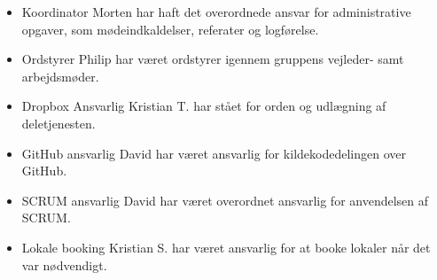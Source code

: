 \begin{itemize}
	\item Koordinator \newline
		Morten har haft det overordnede ansvar for administrative opgaver, som mødeindkaldelser, referater og 			logførelse.
	\item Ordstyrer \newline
		Philip har været ordstyrer igennem gruppens vejleder- samt arbejdsmøder.
	\item Dropbox Ansvarlig \newline
		Kristian T. har stået for orden og udlægning af deletjenesten.
	\item GitHub ansvarlig \newline
		David har været ansvarlig for kildekodedelingen over GitHub.
	\item SCRUM ansvarlig \newline
		David har været overordnet ansvarlig for anvendelsen af SCRUM.
	\item Lokale booking \newline
		Kristian S. har været ansvarlig for at booke lokaler når det var nødvendigt.
\end{itemize}

\clearpage